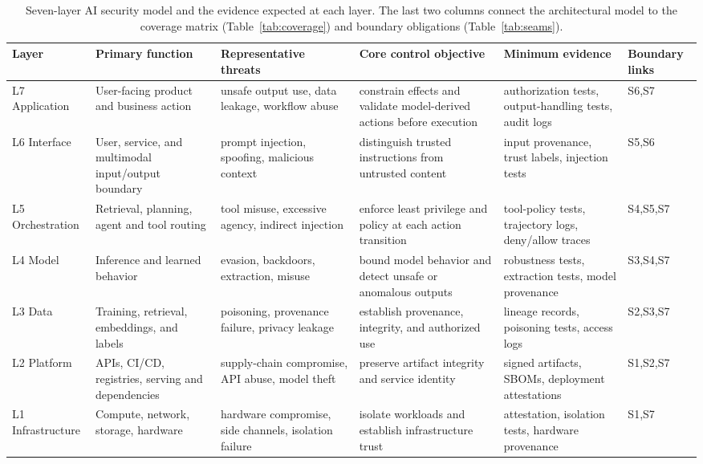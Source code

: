 \documentclass[runningheads]{llncs}
\begin{document}
\begin{table}[t]
\caption{Seven-layer AI security model and the evidence expected at each layer. The last two columns connect the architectural model to the coverage matrix (Table~\ref{tab:coverage}) and boundary obligations (Table~\ref{tab:seams}).}
\label{tab:layers}
\centering
\small
\begin{tabular}{@{}p{1.15cm}p{2.0cm}p{2.35cm}p{2.35cm}p{2.25cm}p{1.65cm}@{}}
\toprule
\textbf{Layer} & \textbf{Primary function} & \textbf{Representative threats} & \textbf{Core control objective} & \textbf{Minimum evidence} & \textbf{Boundary links}\\
\midrule
L7 Application & User-facing product and business action & unsafe output use, data leakage, workflow abuse & constrain effects and validate model-derived actions before execution & authorization tests, output-handling tests, audit logs & S6,S7\\
L6 Interface & User, service, and multimodal input/output boundary & prompt injection, spoofing, malicious context & distinguish trusted instructions from untrusted content & input provenance, trust labels, injection tests & S5,S6\\
L5 Orchestration & Retrieval, planning, agent and tool routing & tool misuse, excessive agency, indirect injection & enforce least privilege and policy at each action transition & tool-policy tests, trajectory logs, deny/allow traces & S4,S5,S7\\
L4 Model & Inference and learned behavior & evasion, backdoors, extraction, misuse & bound model behavior and detect unsafe or anomalous outputs & robustness tests, extraction tests, model provenance & S3,S4,S7\\
L3 Data & Training, retrieval, embeddings, and labels & poisoning, provenance failure, privacy leakage & establish provenance, integrity, and authorized use & lineage records, poisoning tests, access logs & S2,S3,S7\\
L2 Platform & APIs, CI/CD, registries, serving and dependencies & supply-chain compromise, API abuse, model theft & preserve artifact integrity and service identity & signed artifacts, SBOMs, deployment attestations & S1,S2,S7\\
L1 Infrastructure & Compute, network, storage, hardware & hardware compromise, side channels, isolation failure & isolate workloads and establish infrastructure trust & attestation, isolation tests, hardware provenance & S1,S7\\
\bottomrule
\end{tabular}
\end{table}
\end{document}
